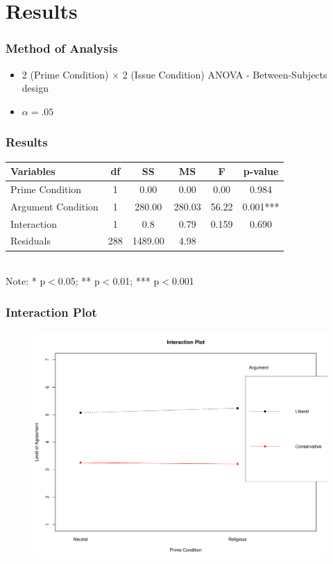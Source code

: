\documentclass[14pt]{beamer}
\newcommand\tb{\textbf}
\begin{document}
\section{Results}

\begin{frame}
\frametitle{Method of Analysis}
\begin{itemize}
	\item 2 (Prime Condition) $\times$ 2 (Issue Condition) ANOVA - Between-Subjects design
	\item $\alpha = .05$
\end{itemize}
\end{frame}

\begin{frame}
\frametitle{Results}
\begin{table}
	\centering
	\small
	\begin{tabular}{lccccc}
		\hline
		\tb{Variables}&\tb{df}&\tb{SS}&\tb{MS}&\tb{F}&\tb{p-value}\\
		\hline
		Prime Condition&1&0.00&0.00&0.00&0.984\\
		Argument Condition&1&280.00&280.03&56.22&0.001***\\
		Interaction&1&0.8&0.79&0.159&0.690\\
		Residuals&288&1489.00&4.98&&\\
		\hline
	\end{tabular}\\
Note: * p$<$0.05; ** p$<$0.01; *** p$<$0.001
\end{table}
\end{frame}

\begin{frame}
\frametitle{Interaction Plot}
\begin{figure}
	\centering
	{\includegraphics[width=.8\textwidth]{InteractionPlot}}
\end{figure}
\end{frame}
\end{document}
